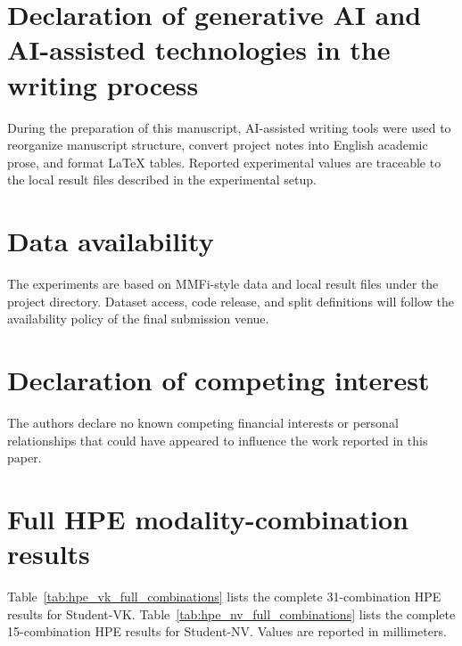 \documentclass[preprint,12pt]{elsarticle}
\begin{document}
\section*{Declaration of generative AI and AI-assisted technologies in the writing process}

During the preparation of this manuscript, AI-assisted writing tools were used to reorganize manuscript structure, convert project notes into English academic prose, and format LaTeX tables. Reported experimental values are traceable to the local result files described in the experimental setup.

\section*{Data availability}

The experiments are based on MMFi-style data and local result files under the project directory. Dataset access, code release, and split definitions will follow the availability policy of the final submission venue.

\section*{Declaration of competing interest}

The authors declare no known competing financial interests or personal relationships that could have appeared to influence the work reported in this paper.

\appendix

\section{Full HPE modality-combination results}

Table~\ref{tab:hpe_vk_full_combinations} lists the complete 31-combination HPE results for Student-VK. Table~\ref{tab:hpe_nv_full_combinations} lists the complete 15-combination HPE results for Student-NV. Values are reported in millimeters.
\end{document}
